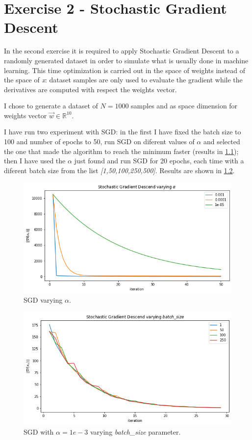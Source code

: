 \documentclass[a4paper,10pt]{report}
\begin{document}
\chapter{Exercise 2 - Stochastic Gradient Descent}\label{chap:sgd}
In the second exercise it is required to apply Stochastic Gradient Descent to a randomly generated dataset in order to simulate what is usually done in machine learning.
This time optimization is carried out in the space of weights instead of the space of \emph{x}: dataset samples are only used to evaluate the gradient while the derivatives are computed with respect the weights vector.

I chose to generate a dataset of $N=1000$ samples and as space dimension for weights vector $\vec{w} \in \mathbb{R}^{10}$.

I have run two experiment with SGD: in the first I have fixed the batch size to 100 and number of epochs to 50, run SGD on diferent values of $\alpha$ and selected the one that made the algorithm to reach the minimum faster (results in \ref{fig:sgd_a});
then I have used the $\alpha$ just found and run SGD for 20 epochs, each time with a diferent batch size from the list \emph{[1,50,100,250,500]}.
Results are shown in \ref{fig:sgd_n}.

\begin{figure}[!htb]
  \center
  \includegraphics[width=0.8\linewidth]{sgd_a.png}
  \caption{SGD varying $\alpha$.}
  \label{fig:sgd_a}
\end{figure}

\begin{figure}[!htb]
  \center
  \includegraphics[width=0.8\linewidth]{sgd_n.png}
  \caption{SGD with $\alpha=1e-3$ varying \emph{batch_size} parameter.}
  \label{fig:sgd_n}
\end{figure}
\end{document}
